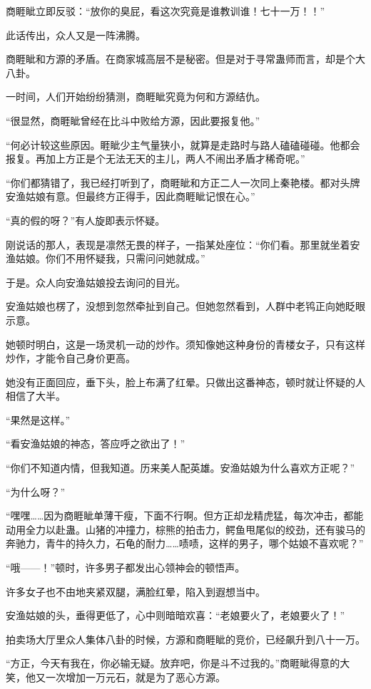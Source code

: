 \begin{this_body}
商睚眦立即反驳：“放你的臭屁，看这次究竟是谁教训谁！七十一万！！”

此话传出，众人又是一阵沸腾。

商睚眦和方源的矛盾。在商家城高层不是秘密。但是对于寻常蛊师而言，却是个大八卦。

一时间，人们开始纷纷猜测，商睚眦究竟为何和方源结仇。

“很显然，商睚眦曾经在比斗中败给方源，因此要报复他。”

“何必计较这些原因。睚眦少主气量狭小，就算是走路时与路人磕磕碰碰。他都会报复。再加上方正是个无法无天的主儿，两人不闹出矛盾才稀奇呢。”

“你们都猜错了，我已经打听到了，商睚眦和方正二人一次同上秦艳楼。都对头牌安渔姑娘有意。但最终方正得手，因此商睚眦记恨在心。”

“真的假的呀？”有人旋即表示怀疑。

刚说话的那人，表现是凛然无畏的样子，一指某处座位：“你们看。那里就坐着安渔姑娘。你们不用怀疑我，只需问问她就成。”

于是。众人向安渔姑娘投去询问的目光。

安渔姑娘也楞了，没想到忽然牵扯到自己。但她忽然看到，人群中老鸨正向她眨眼示意。

她顿时明白，这是一场灵机一动的炒作。须知像她这种身份的青楼女子，只有这样炒作，才能令自己身价更高。

她没有正面回应，垂下头，脸上布满了红晕。只做出这番神态，顿时就让怀疑的人相信了大半。

“果然是这样。”

“看安渔姑娘的神态，答应呼之欲出了！”

“你们不知道内情，但我知道。历来美人配英雄。安渔姑娘为什么喜欢方正呢？”

“为什么呀？”

“嘿嘿……因为商睚眦单薄干瘦，下面不行啊。但方正却龙精虎猛，每次冲击，都能动用全力以赴蛊。山猪的冲撞力，棕熊的拍击力，鳄鱼甩尾似的绞劲，还有骏马的奔驰力，青牛的持久力，石龟的耐力……啧啧，这样的男子，哪个姑娘不喜欢呢？”

“哦——！”顿时，许多男子都发出心领神会的顿悟声。

许多女子也不由地夹紧双腿，满脸红晕，陷入到遐想当中。

安渔姑娘的头，垂得更低了，心中则暗暗欢喜：“老娘要火了，老娘要火了！”

拍卖场大厅里众人集体八卦的时候，方源和商睚眦的竞价，已经飙升到八十一万。

“方正，今天有我在，你必输无疑。放弃吧，你是斗不过我的。”商睚眦得意的大笑，他又一次增加一万元石，就是为了恶心方源。


\end{this_body}
